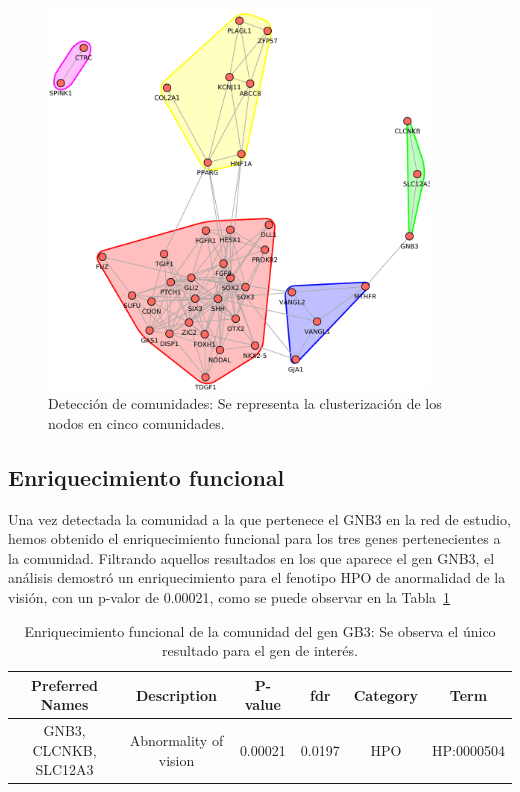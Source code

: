 \begin{figure}[h!]
	\includegraphics[width=0.9\textwidth]{figures/comunidades.pdf}
	\caption{Detección de comunidades: Se representa la clusterización de los nodos en cinco comunidades.}
	\label{fig:comunidad}
\end{figure}

\subsection{Enriquecimiento funcional}

Una vez detectada la comunidad a la que pertenece el GNB3 en la red de estudio, hemos obtenido el enriquecimiento funcional para los tres genes pertenecientes a la comunidad.  Filtrando aquellos resultados en los que aparece el gen GNB3, el análisis demostró un enriquecimiento para el fenotipo HPO de anormalidad de la visión, con un p-valor de 0.00021, como se puede observar en la Tabla~\ref{table:enriquecimiento1}

\begin{table}[h]
	\centering
	\caption{Enriquecimiento funcional de la comunidad del gen GB3: Se observa el único resultado para el gen de interés.}
	\label{table:enriquecimiento1}
	\begin{tabular}{|c|c|c|c|c|c|}
		\hline
		\textbf{Preferred Names} & \textbf{Description} & \textbf{P-value} & \textbf{fdr} & \textbf{Category} & \textbf{Term} \\ \hline
		GNB3, CLCNKB, SLC12A3 & Abnormality of vision    & 0.00021 & 0.0197&  HPO & HP:0000504 \\ \hline

	\end{tabular}

\end{table}

